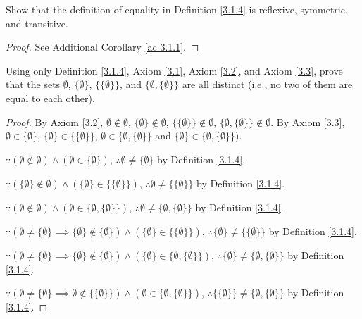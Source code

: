 \exercisesection

\begin{exercise}\label{ex 3.1.1}
Show that the definition of equality in Definition \ref{3.1.4} is reflexive, symmetric, and transitive.
\end{exercise}

\begin{proof}
See Additional Corollary \ref{ac 3.1.1}.
\end{proof}

\begin{exercise}\label{ex 3.1.2}
Using only Definition \ref{3.1.4}, Axiom \ref{3.1}, Axiom \ref{3.2}, and Axiom \ref{3.3}, prove that the sets \(\emptyset\), \(\{\emptyset\}\), \(\{\{\emptyset\}\}\), and \(\{\emptyset, \{\emptyset\}\}\) are all distinct
(i.e., no two of them are equal to each other).
\end{exercise}

\begin{proof}
By Axiom \ref{3.2}, \(\emptyset \notin \emptyset\), \(\{\emptyset\} \notin \emptyset\), \(\{\{\emptyset\}\} \notin \emptyset\), \(\{\emptyset, \{\emptyset\}\} \notin \emptyset\).
By Axiom \ref{3.3}, \(\emptyset \in \{\emptyset\}\), \(\{\emptyset\} \in \{\{\emptyset\}\}\), \(\emptyset \in \{\emptyset, \{\emptyset\}\}\) and \(\{\emptyset\} \in \{\emptyset, \{\emptyset\}\})\).

\(\because (\emptyset \notin \emptyset) \land (\emptyset \in \{\emptyset\})\), \(\therefore \emptyset \neq \{\emptyset\}\) by Definition \ref{3.1.4}.

\(\because (\{\emptyset\} \notin \emptyset) \land (\{\emptyset\} \in \{\{\emptyset\}\})\), \(\therefore \emptyset \neq \{\{\emptyset\}\}\) by Definition \ref{3.1.4}.

\(\because (\emptyset \notin \emptyset) \land (\emptyset \in \{\emptyset, \{\emptyset\}\})\), \(\therefore \emptyset \neq \{\emptyset, \{\emptyset\}\}\) by Definition \ref{3.1.4}.

\(\because (\emptyset \neq \{\emptyset\} \implies \{\emptyset\} \notin \{\emptyset\}) \land (\{\emptyset\} \in \{\{\emptyset\}\})\), \(\therefore \{\emptyset\} \neq \{\{\emptyset\}\}\) by Definition \ref{3.1.4}.

\(\because (\emptyset \neq \{\emptyset\} \implies \{\emptyset\} \notin \{\emptyset\}) \land (\{\emptyset\} \in \{\emptyset, \{\emptyset\}\})\), \(\therefore \{\emptyset\} \neq \{\emptyset, \{\emptyset\}\}\) by Definition \ref{3.1.4}.

\(\because (\emptyset \neq \{\emptyset\} \implies \emptyset \notin \{\{\emptyset\}\}) \land (\emptyset \in \{\emptyset, \{\emptyset\}\})\), \(\therefore \{\{\emptyset\}\} \neq \{\emptyset, \{\emptyset\}\}\) by Definition \ref{3.1.4}.
\end{proof}

